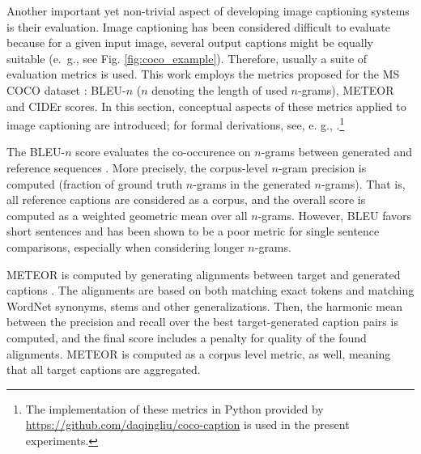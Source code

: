 Another important yet non-trivial aspect of developing image captioning systems is their evaluation. Image captioning has been considered difficult to evaluate because for a given input image, several output captions might be equally suitable (e.~g., see Fig. \ref{fig:coco_example}). Therefore, usually a suite of evaluation metrics is used. This work employs the metrics proposed for the MS COCO dataset \parencite{chen2015microsoft}: BLEU-$n$ ($n$ denoting the length of used $n$-grams), METEOR and CIDEr scores. In this section, conceptual aspects of these metrics applied to image captioning are introduced; for formal derivations, see, e. g., \cite{chen2015microsoft}.\footnote{The implementation of these metrics in Python provided by \url{https://github.com/daqingliu/coco-caption} is used in the present experiments.}

The BLEU-$n$ score evaluates the co-occurence on $n$-grams between generated and reference sequences \parencite{papineni2002bleu}. More precisely, the corpus-level $n$-gram precision is computed (fraction of ground truth $n$-grams in the generated $n$-grams). That is, all reference captions are considered as a corpus, and the overall score is computed as a weighted geometric mean over all $n$-grams. However, BLEU favors short sentences and has been shown to be a poor metric for single sentence comparisons, especially when considering longer $n$-grams.


METEOR is computed by generating alignments between target and generated captions \parencite{banerjee2005meteor}. The alignments are based on both matching exact tokens and matching WordNet synonyms, stems and other generalizations. Then, the harmonic mean between the precision and recall over the best target-generated caption pairs is computed, and the final score includes a penalty for quality of the found alignments. METEOR is computed as a corpus level metric, as well, meaning that all target captions are aggregated.
 
